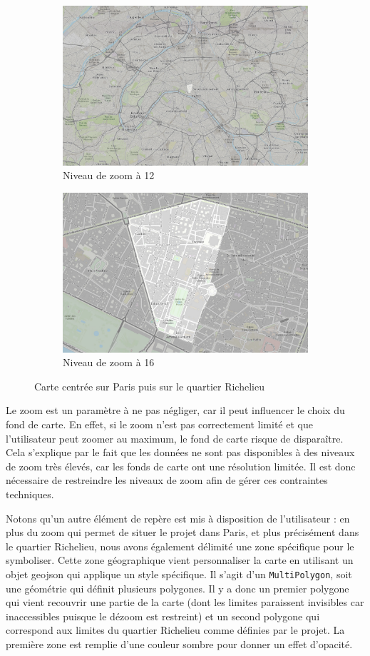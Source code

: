 \begin{figure}[h!]
    \begin{subfigure}{.5\textwidth}
      \centering
      \includegraphics[width=0.7\linewidth]{images/zoom-12.png}
      \caption{Niveau de zoom à 12}
      \label{fig:zoom-12}
    \end{subfigure}
    \begin{subfigure}{.5\textwidth}
      \centering
      \includegraphics[width=.7\linewidth]{images/zoom-16.png}
      \caption{Niveau de zoom à 16}
      \label{fig:zoom-16}
    \end{subfigure}
\caption{Carte centrée sur Paris puis sur le quartier Richelieu}
\label{fig:zoom}
\end{figure}
Le zoom est un paramètre à ne pas négliger, car il peut influencer le choix du fond de carte. En effet, si le zoom n'est pas correctement limité et que l'utilisateur peut zoomer au maximum, le fond de carte risque de disparaître. Cela s'explique par le fait que les données ne sont pas disponibles à des niveaux de zoom très élevés, car les fonds de carte ont une résolution limitée. Il est donc nécessaire de restreindre les niveaux de zoom afin de gérer ces contraintes techniques.

Notons qu'un autre élément de repère est mis à disposition de l'utilisateur : en plus du zoom qui permet de situer le projet dans Paris, et plus précisément dans le quartier Richelieu, nous avons également délimité une zone spécifique pour le symboliser. Cette zone géographique vient personnaliser la carte en utilisant un objet \acrshort{geojson} qui applique un style spécifique. Il s'agit d'un \texttt{MultiPolygon}, soit une géométrie qui définit plusieurs polygones. Il y a donc un premier polygone qui vient recouvrir une partie de la carte (dont les limites paraissent invisibles car inaccessibles puisque le dézoom est restreint) et un second polygone qui correspond aux limites du quartier Richelieu comme définies par le projet. La première zone est remplie d'une couleur sombre pour donner un effet d'opacité. 

